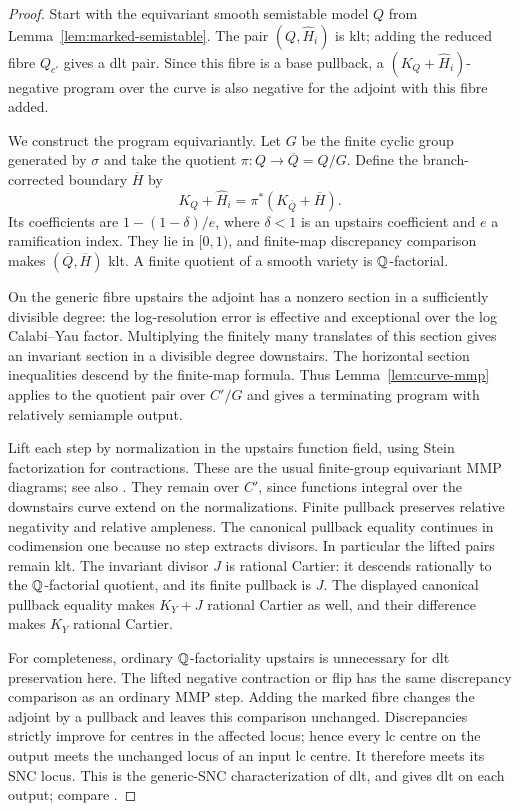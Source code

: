 \begin{proof}
Start with the equivariant smooth semistable model $Q$ from
Lemma~\ref{lem:marked-semistable}. The pair $(Q,\widehat H_i)$ is klt;
adding the reduced fibre $Q_{c'}$ gives a dlt pair. Since this fibre
is a base pullback, a $(K_Q+\widehat H_i)$-negative program over the
curve is also negative for the adjoint with this fibre added.

We construct the program equivariantly. Let $G$ be the finite cyclic
group generated by $\sigma$ and take the quotient
$\pi:Q\to\overline Q=Q/G$. Define the branch-corrected boundary
$\overline H$ by
\[
          K_Q+\widehat H_i
                 =\pi^*(K_{\overline Q}+\overline H).
\]
Its coefficients are $1-(1-\delta)/e$, where $\delta<1$ is an
upstairs coefficient and $e$ a ramification index. They lie in $[0,1)$,
and finite-map discrepancy comparison makes
$(\overline Q,\overline H)$ klt. A finite quotient of a smooth variety
is $\mathbb Q$-factorial.

On the generic fibre upstairs the adjoint has a nonzero section in
a sufficiently divisible degree: the log-resolution error is effective
and exceptional over the log Calabi--Yau factor. Multiplying the
finitely many translates of this section gives an invariant section
in a divisible degree downstairs. The horizontal section inequalities
descend by the finite-map formula. Thus Lemma~\ref{lem:curve-mmp}
applies to the quotient pair over $C'/G$ and gives a terminating
program with relatively semiample output.

Lift each step by normalization in the upstairs function field,
using Stein factorization for contractions. These are the usual
finite-group equivariant MMP diagrams; see also
\cite[Complement~3 and Paragraph~21]{KNX}.
They remain over $C'$, since functions integral over the downstairs
curve extend on the normalizations. Finite pullback preserves relative
negativity and relative ampleness. The canonical pullback equality
continues in codimension one because no step extracts divisors.
In particular the lifted pairs remain klt. The invariant divisor $J$
is rational Cartier: it descends rationally to the $\mathbb Q$-factorial
quotient, and its finite pullback is $J$. The displayed canonical
pullback equality makes $K_Y+J$ rational Cartier as well, and their
difference makes $K_Y$ rational Cartier.

For completeness, ordinary $\mathbb Q$-factoriality upstairs is unnecessary
for dlt preservation here. The lifted negative contraction or flip
has the same discrepancy comparison as an ordinary MMP step.
Adding the marked fibre changes the adjoint by a pullback and leaves
this comparison unchanged. Discrepancies strictly improve for centres
in the affected locus; hence every lc centre on the output meets the
unchanged locus of an input lc centre. It therefore meets its SNC
locus. This is the generic-SNC characterization of dlt, and gives dlt
on each output; compare \cite[Section~3, before Lemma~16]{dFKX}.


\end{proof}
